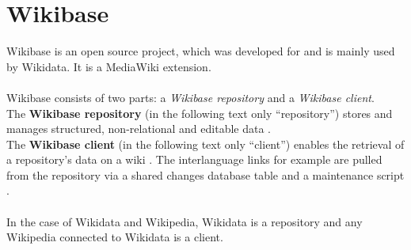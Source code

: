 \section{Wikibase}
Wikibase is an open source project, which was developed for and is mainly used by Wikidata. It is a MediaWiki extension. \\
\\
Wikibase consists of two parts: a \textit{Wikibase repository} and a \textit{Wikibase client}. \\
The \textbf{Wikibase repository} (in the following text only ``repository'')  stores and manages structured, non-relational and editable data \citep{wikibase:01}. \\
The \textbf{Wikibase client} (in the following text only ``client'') enables the retrieval of a repository's data on a wiki \citep{wikibase:01}. The interlanguage links for example are pulled from the repository via a shared changes database table and a maintenance script \citep{wiki:18}. \\
\\
In the case of Wikidata and Wikipedia, Wikidata is a repository and any Wikipedia connected to Wikidata is a client.